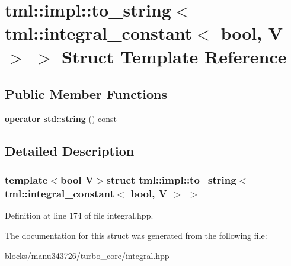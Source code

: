 \hypertarget{structtml_1_1impl_1_1to__string_3_01tml_1_1integral__constant_3_01bool_00_01_v_01_4_01_4}{\section{tml\+:\+:impl\+:\+:to\+\_\+string$<$ tml\+:\+:integral\+\_\+constant$<$ bool, V $>$ $>$ Struct Template Reference}
\label{structtml_1_1impl_1_1to__string_3_01tml_1_1integral__constant_3_01bool_00_01_v_01_4_01_4}
}
\subsection*{Public Member Functions}
\begin{DoxyCompactItemize}
\item 
\hypertarget{structtml_1_1impl_1_1to__string_3_01tml_1_1integral__constant_3_01bool_00_01_v_01_4_01_4_ac091de75d83cfc5d18538d07a5634d39}{{\bfseries operator std\+::string} () const }\label{structtml_1_1impl_1_1to__string_3_01tml_1_1integral__constant_3_01bool_00_01_v_01_4_01_4_ac091de75d83cfc5d18538d07a5634d39}

\end{DoxyCompactItemize}


\subsection{Detailed Description}
\subsubsection*{template$<$bool V$>$struct tml\+::impl\+::to\+\_\+string$<$ tml\+::integral\+\_\+constant$<$ bool, V $>$ $>$}



Definition at line 174 of file integral.\+hpp.



The documentation for this struct was generated from the following file\+:\begin{DoxyCompactItemize}
\item 
blocks/manu343726/turbo\+\_\+core/integral.\+hpp\end{DoxyCompactItemize}

